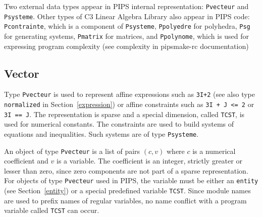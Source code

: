\documentclass[a4paper]{article}
\begin{document}
Two external data types appear in PIPS internal representation:
\verb/Pvecteur/ and \verb/Psysteme/. Other types of C3 Linear Algebra
Library also appear in PIPS code: \verb/Pcontrainte/, which is a
component of \verb/Psysteme/, \verb/Ppolyedre/ for polyhedra,
\verb/Psg/ for generating systems, \verb/Pmatrix/ for matrices, and
\verb/Ppolynome/, which is used for expressing program complexity (see
complexity in pipsmake-rc documentation)

\subsection{Vector}
\label{subsection-pvecteur}

{}

Type \texttt{Pvecteur} is used to represent affine expressions such as 
\texttt{3I+2} (see also type \texttt{normalized} in Section~\ref{expression}) or
affine constraints such as \texttt{3I + J <= 2} or \texttt{3I == J}. The
representation is sparse and a special dimension, called 
\texttt{TCST}, is used for numerical constants. The constraints are used to
build systems of equations and inequalities. Such systems are of type
\texttt{Psysteme}.

\begin{comment}
Le domaine \texttt{Pvecteur} est utilis� pour repr�senter les
expressions lin�aires telles que \texttt{3I+2} (voir le domaine 
\texttt{normalized}) ou des contraintes lin�aires telles que \texttt{3I + J <= 2}
ou \texttt{3I == J}. Ces contraintes sont utilis�es dans les syst�mes
lin�aires (voir le domaine \texttt{Psysteme}).
\end{comment}

An object of type \texttt{Pvecteur} is a list of pairs $(c,v)$ where $c$ is
a numerical coefficient and $v$ is a variable. The coefficient is an
integer, strictly greater or lesser than zero, since zero components are
not part of a sparse representation. For objects of type \texttt{Pvecteur}
used in PIPS, the variable must be either an \texttt{entity} (see
Section~\ref{entity}) or a special predefined variable \texttt{TCST}. Since
module names are used to prefix names of regular variables, no name
conflict with a program variable called \texttt{TCST} can occur.

\begin{comment}
Un Pvecteur est une suite de mon�mes, un mon�me �tant un couple
(coefficient,variable).  Le coefficient d'un tel couple est un entier,
positif ou n�gatif. La variable est une entit�, sauf dans le cas du
terme constant qui est repr�sent� par la variable pr�d�finie de nom
\texttt{TCST}\footnote{Comme on rajoute le nom des modules devant les
noms de variables, il ne peut pas y avoir de conflict avec une
�ventuelle variable \texttt{TCST}.}.
\end{comment}
\end{document}
